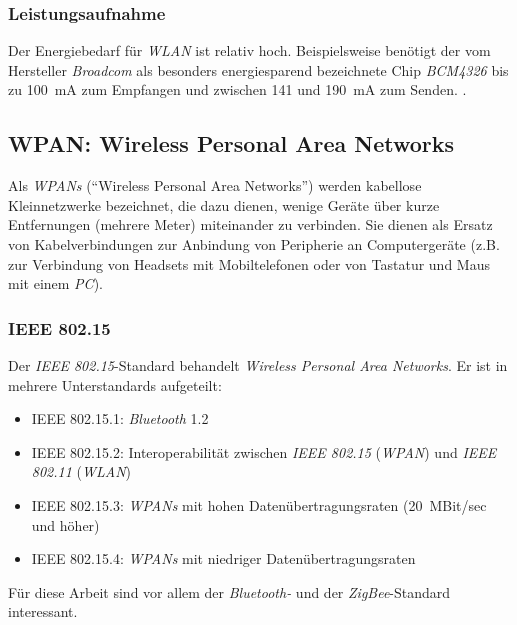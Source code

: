         \subsubsection{Leistungsaufnahme}
            Der Energiebedarf für \emph{WLAN} ist relativ hoch. Beispielsweise benötigt der
            vom Hersteller \emph{Broadcom} als besonders energiesparend bezeichnete Chip
            \emph{BCM4326} bis zu 100~mA zum Empfangen und zwischen 141 und 190~mA zum Senden.
            \cite{BCM4326_Datasheet}. 

    \subsection{WPAN: Wireless Personal Area Networks}
            Als \emph{WPANs} ("`Wireless Personal Area Networks"') werden kabellose Kleinnetzwerke bezeichnet, die dazu 
            dienen, wenige Geräte über kurze Entfernungen (mehrere Meter) miteinander zu verbinden. Sie dienen als Ersatz 
            von Kabelverbindungen zur Anbindung von Peripherie an Computergeräte (z.B. zur Verbindung von
            Headsets mit Mobiltelefonen oder von Tastatur und Maus mit einem \emph{PC}).
            

        \subsubsection{IEEE 802.15}
            Der \emph{IEEE 802.15}-Standard behandelt \textsl{Wireless Personal Area Networks}. Er ist in mehrere 
            Unterstandards aufgeteilt:

             \begin{itemize}
                \item{IEEE 802.15.1:} \emph{Bluetooth} 1.2
                \item{IEEE 802.15.2:} Interoperabilität zwischen \emph{IEEE 802.15} (\emph{WPAN}) 
                                      und \emph{IEEE 802.11} (\emph{WLAN})
                \item{IEEE 802.15.3:} \emph{WPANs} mit hohen Datenübertragungsraten (20~MBit/sec und höher)
                \item{IEEE 802.15.4:} \emph{WPANs} mit niedriger Datenübertragungsraten
            \end{itemize}

            Für diese Arbeit sind vor allem der \emph{Bluetooth-} und der \emph{ZigBee}-Standard interessant. 

